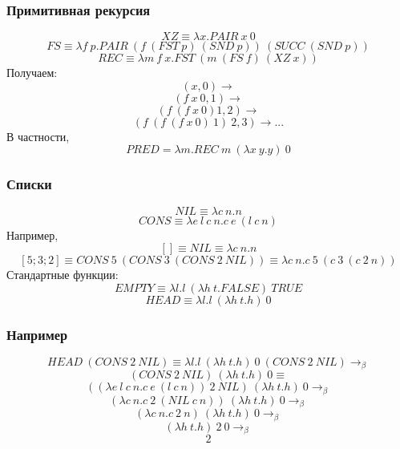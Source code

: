 \documentclass{../../slides-style}
\begin{document}
    \begin{frame}
        \frametitle{Примитивная рекурсия}
        $$XZ \equiv \lambda x.PAIR\ x\ 0$$
        $$FS \equiv \lambda f\ p.PAIR\ (f\ (FST\ p)\ (SND\ p))\ (SUCC\ (SND\ p))$$
        $$REC \equiv \lambda m\ f\ x.FST\ (m\ (FS\ f)\ (XZ\ x))$$
        Получаем:
        $$(x, 0) \rightarrow$$
        $$(f\ x\ 0, 1) \rightarrow$$
        $$(f\ (f\ x\ 0) 1, 2) \rightarrow$$
        $$(f\ (f\ (f\ x\ 0)\ 1)\ 2, 3) \rightarrow ...$$
        В частности, 
        $$PRED = \lambda m.REC\ m\ (\lambda x\ y.y)\ 0$$
    \end{frame}

    \begin{frame}
        \frametitle{Списки}
        $$NIL \equiv \lambda c\ n.n$$
        $$CONS \equiv \lambda e\ l\ c\ n.c\ e\ (l\ c\ n)$$
        Например,
        $$[] \equiv NIL \equiv \lambda c\ n.n$$
        $$[5; 3; 2] \equiv CONS\ 5\ (CONS\ 3\ (CONS\ 2\ NIL)) \equiv \lambda c\ n.c\ 5\ (c\ 3\ (c\ 2\ n))$$
        Стандартные функции:
        $$EMPTY \equiv \lambda l.l\ (\lambda h\ t.FALSE)\ TRUE$$
        $$HEAD \equiv \lambda l.l\ (\lambda h\ t.h)\ 0$$
    \end{frame}

    \begin{frame}
        \frametitle{Например}
        $$HEAD\ (CONS\ 2\ NIL) \equiv \lambda l.l\ (\lambda h\ t.h)\ 0\ (CONS\ 2\ NIL) \rightarrow_\beta$$
        $$    (CONS\ 2\ NIL)\ (\lambda h\ t.h)\ 0 \equiv$$
        $$    ((\lambda e\ l\ c\ n.c\ e\ (l\ c\ n))\ 2\ NIL)\ (\lambda h\ t.h)\ 0 \rightarrow_\beta$$
        $$    (\lambda c\ n.c\ 2\ (NIL\ c\ n))\ (\lambda h\ t.h)\ 0 \rightarrow_\beta$$
        $$    (\lambda c\ n.c\ 2\ n)\ (\lambda h\ t.h)\ 0 \rightarrow_\beta$$
        $$    (\lambda h\ t.h)\ 2\ 0 \rightarrow_\beta$$
        $$    2$$
    \end{frame}
\end{document}

